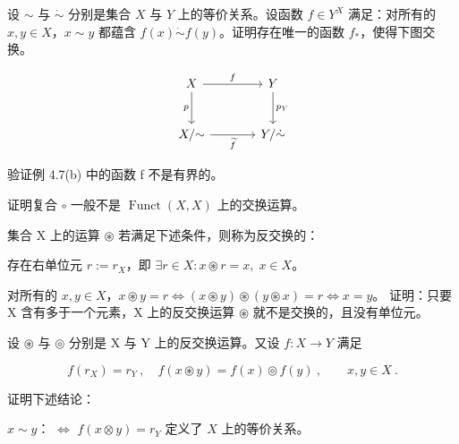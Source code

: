 \begin{exercises}
\item

设 $\sim$ 与 $\dot{\sim}$ 分别是集合 $X$ 与 $Y$ 上的等价关系。设函数 $f \in Y^X$ 满足：对所有的 $x, y \in X$，$x \sim y$ 都蕴含 $f(x) \dot{\sim} f(y)$。证明存在唯一的函数 $f_*$，使得下图交换。

\[
\begin{tikzcd}[row sep=2.6em, column sep=3.6em]
X \arrow[r, "f"] \arrow[d, "p"'] & Y \arrow[d, "p_{Y}"] \\
X/{\sim} \arrow[r, "\widetilde{f}"'] & Y/{\dot{\sim}}
\end{tikzcd}
\]
\item

验证例 4.7(b) 中的函数 f 不是有界的。

\item

证明复合  $ \circ $ 一般不是  $ \operatorname{Funct}(X, X) $ 上的交换运算。

\item

集合 X 上的运算  $ \circledast $ 若满足下述条件，则称为反交换的：

\begin{subitems}
\item

存在右单位元  $ r := r_X $，即  $ \exists r \in X: x \circledast r = x, \; x \in X $。

\item

对所有的  $ x, y \in X $，$ x \circledast y = r \Leftrightarrow (x \circledast y) \circledast (y \circledast x) = r \Leftrightarrow x = y $。
证明：只要 X 含有多于一个元素，X 上的反交换运算  $ \circledast $ 就不是交换的，且没有单位元。

\end{subitems}

\item

设  $ \circledast $ 与  $ \circledcirc $ 分别是 X 与 Y 上的反交换运算。又设  $ f: X \to Y $ 满足

\[
f(r_{X})=r_{Y}~,\quad f(x\circledast y)=f(x)\circledcirc f(y)~,\qquad x,y\in X~.
\]

证明下述结论：

\begin{items}
\item

$ x \sim y  $：  $ \Leftrightarrow $  $ f(x \otimes y) = r_Y $ 定义了  $ X $ 上的等价关系。


\end{items}
\end{exercises}
